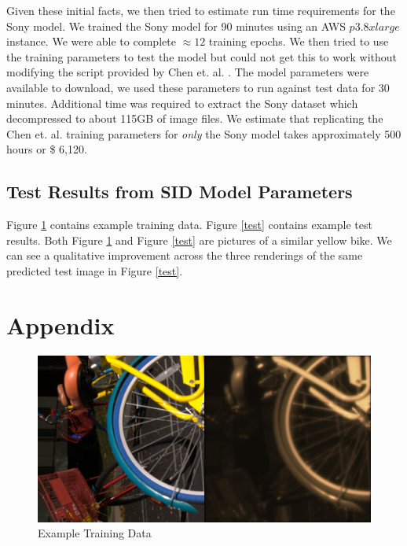 \documentclass{article}
\begin{document}
Given these initial facts, we then tried to estimate run time requirements
for the Sony model. We trained the Sony model for 90 minutes using an
AWS $p3.8xlarge$ instance. We were able to complete $\approx 12$ training
epochs. We then tried to use the training parameters to
test the model but could not get this to work without modifying the script
provided by Chen et. al. \cite{chen2018learning}. The model parameters
were available to download, we used these parameters to run against test
data for 30 minutes. Additional time was required to extract the Sony dataset
which decompressed to about 115GB of image files. We estimate that
replicating the Chen et. al. \cite{chen2018learning} training parameters
for \textit{only} the Sony model takes approximately 500 hours or
\$ 6,120.

\subsection{Test Results from SID Model Parameters}

Figure \ref{train} contains example training data. Figure \ref{test}
contains example test results. Both Figure \ref{train} and Figure \ref{test}
are pictures of a similar yellow bike. We can see a qualitative improvement
across the three renderings of the same predicted test image in
Figure \ref{test}.

\section{Appendix}

\begin{figure}[h!]
  \centering
  \includegraphics[scale=0.1]{00002_00_train_100}
  \caption{\label{train} Example Training Data}
\end{figure}
\end{document}
